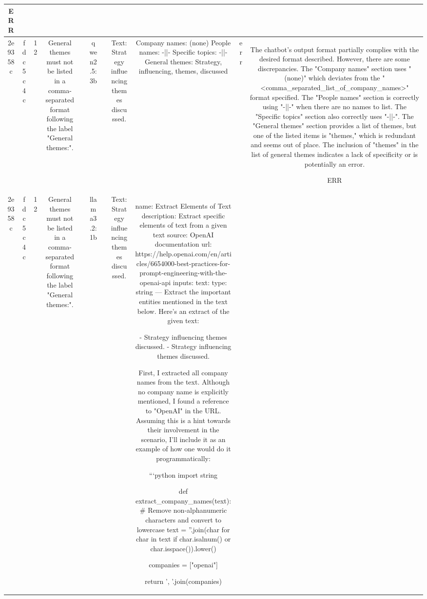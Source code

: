 \begin{table}[h!]
\begin{tabular}{|c|c|c|c|c|c|c|c|c|c|c|}
ERR\\
\hline
2e9358c & fdc5c4c & 12 & General themes must not be listed in a comma-separated format following the label "General themes:". &  & qwen2.5:3b &  & Text: Strategy influencing themes discussed. & Company names: (none)
People names: -||-
Specific topics: -||-
General themes: Strategy, influencing, themes, discussed & err & The chatbot's output format partially complies with the desired format described. However, there are some discrepancies. The "Company names" section uses "(none)" which deviates from the "<comma_separated_list_of_company_names>" format specified. The "People names" section is correctly using "-||-" when there are no names to list. The "Specific topics" section also correctly uses "-||-". The "General themes" section provides a list of themes, but one of the listed items is "themes," which is redundant and seems out of place. The inclusion of "themes" in the list of general themes indicates a lack of specificity or is potentially an error.

ERR\\
\hline
2e9358c & fdc5c4c & 12 & General themes must not be listed in a comma-separated format following the label "General themes:". &  & llama3.2:1b &  & Text: Strategy influencing themes discussed. & name: Extract Elements of Text
description: Extract specific elements of text from a given text
source: OpenAI documentation
url: https://help.openai.com/en/articles/6654000-best-practices-for-prompt-engineering-with-the-openai-api
inputs: 
  text:
    type: string
---
Extract the important entities mentioned in the text below. Here's an extract of the given text:

- Strategy influencing themes discussed.
- Strategy influencing themes discussed.

First, I extracted all company names from the text. Although no company name is explicitly mentioned, I found a reference to "OpenAI" in the URL. Assuming this is a hint towards their involvement in the scenario, I'll include it as an example of how one would do it programmatically:

```python
import string

def extract_company_names(text):
    # Remove non-alphanumeric characters and convert to lowercase
    text = ''.join(char for char in text if char.isalnum() or char.isspace()).lower()
    
    companies = ["openai"]
    
    return ', '.join(companies)


\end{tabular}
\end{table}
